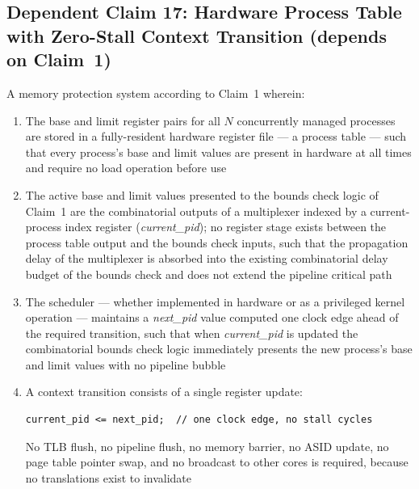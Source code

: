 \documentclass[12pt,letterpaper]{article}
\begin{document}
\medskip

\subsection*{Dependent Claim 17: Hardware Process Table with Zero-Stall
  Context Transition (depends on Claim~1)}

A memory protection system according to Claim~1 wherein:

\begin{enumerate}[label=(\alph*),noitemsep]
  \item The base and limit register pairs for all $N$ concurrently
        managed processes are stored in a fully-resident hardware
        register file --- a process table --- such that every
        process's base and limit values are present in hardware at
        all times and require no load operation before use

  \item The active base and limit values presented to the bounds
        check logic of Claim~1 are the combinatorial outputs of a
        multiplexer indexed by a current-process index register
        (\textit{current\_pid}); no register stage exists between
        the process table output and the bounds check inputs, such
        that the propagation delay of the multiplexer is absorbed
        into the existing combinatorial delay budget of the bounds
        check and does not extend the pipeline critical path

  \item The scheduler --- whether implemented in hardware or as a
        privileged kernel operation --- maintains a
        \textit{next\_pid} value computed one clock edge ahead of
        the required transition, such that when \textit{current\_pid}
        is updated the combinatorial bounds check logic immediately
        presents the new process's base and limit values with no
        pipeline bubble

  \item A context transition consists of a single register update:
        \begin{lstlisting}
current_pid <= next_pid;  // one clock edge, no stall cycles
        \end{lstlisting}
        No TLB flush, no pipeline flush, no memory barrier, no
        ASID update, no page table pointer swap, and no broadcast
        to other cores is required, because no translations exist
        to invalidate


\end{enumerate}
\end{document}
